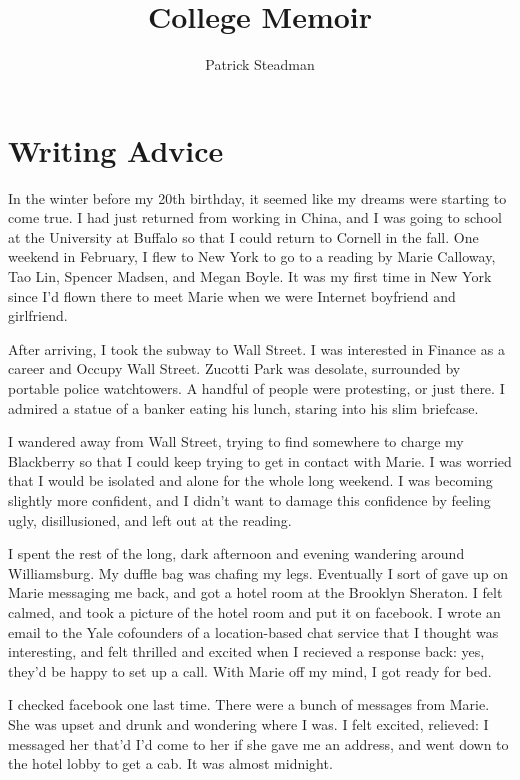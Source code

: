 \documentclass[12pt]{article}
\title{College Memoir}
\author{Patrick Steadman}
\begin{document}
\maketitle

\section{Writing Advice}
In the winter before my 20th birthday, it seemed like my dreams were starting to
come true.  I had just returned from working in China, and I was going to school
at the University at Buffalo so that I could return to Cornell in the fall.  One
weekend in February, I flew to New York to go to a reading by Marie Calloway,
Tao Lin, Spencer Madsen, and Megan Boyle.  It was my first time in New York
since I'd flown there to meet Marie when we were Internet boyfriend and
girlfriend.  

After arriving, I took the subway to Wall Street.  I was interested in Finance
as a career and Occupy Wall Street.  Zucotti Park was desolate, surrounded by
portable police watchtowers. A handful of people were protesting, or just there.
I admired a statue of a banker eating his lunch, staring into his slim
briefcase.

I wandered away from Wall Street, trying to find somewhere to charge my
Blackberry  so that I could keep trying to get in contact with Marie. I was
worried that I would be isolated and alone for the whole long weekend.  I was
becoming slightly more confident, and I didn't want to damage this confidence by
feeling ugly, disillusioned, and left out at the reading.

I spent the rest of the long, dark afternoon and evening wandering around
Williamsburg.  My duffle bag was chafing my legs.  Eventually I sort of gave up
on Marie messaging me back, and got a hotel room at the Brooklyn Sheraton.  I
felt calmed, and took a picture of the hotel room and put it on facebook.  I
wrote an email to the Yale cofounders of a location-based chat service that I
thought was interesting, and felt thrilled and excited when I recieved a
response back: yes, they'd be happy to set up a call.  With Marie off my mind, I
got ready for bed.  

I checked facebook one last time.  There were a bunch of messages from Marie.
She was upset and drunk and wondering where I was.  I felt excited, relieved: I
messaged her that'd I'd come to her if she gave me an address, and went down to
the hotel lobby to get a cab.  It was almost midnight.
\end{document}
